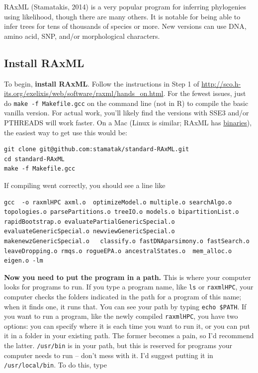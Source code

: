 \documentclass[]{article}
\begin{document}
RAxML (Stamatakis, 2014) is a very popular program for inferring phylogenies using likelihood, though there are many others. It is notable for being able to infer trees for tens of thousands of species or more. New versions can use DNA, amino acid, SNP, and/or morphological characters.

\hypertarget{install-raxml}{%
\subsection{Install RAxML}\label{install-raxml}}

To begin, \textbf{install RAxML}. Follow the instructions in Step 1 of \url{http://sco.h-its.org/exelixis/web/software/raxml/hands_on.html}. For the fewest issues, just do \texttt{make\ -f\ Makefile.gcc} on the command line (not in R) to compile the basic vanilla version. For actual work, you'll likely find the versions with SSE3 and/or PTHREADS will work faster. On a Mac (Linux is similar; RAxML has \href{https://github.com/stamatak/standard-RAxML/tree/master/WindowsExecutables_v8.2.4}{binaries}), the easiest way to get use this would be:

\begin{verbatim}
git clone git@github.com:stamatak/standard-RAxML.git
cd standard-RAxML
make -f Makefile.gcc
\end{verbatim}

If compiling went correctly, you should see a line like

\begin{verbatim}
gcc  -o raxmlHPC axml.o  optimizeModel.o multiple.o searchAlgo.o topologies.o parsePartitions.o treeIO.o models.o bipartitionList.o rapidBootstrap.o evaluatePartialGenericSpecial.o evaluateGenericSpecial.o newviewGenericSpecial.o makenewzGenericSpecial.o   classify.o fastDNAparsimony.o fastSearch.o leaveDropping.o rmqs.o rogueEPA.o ancestralStates.o  mem_alloc.o  eigen.o -lm
\end{verbatim}

\textbf{Now you need to put the program in a path.} This is where your computer looks for programs to run. If you type a program name, like \texttt{ls} or \texttt{raxmlHPC}, your computer checks the folders indicated in the path for a program of this name; when it finds one, it runs that. You can see your path by typing \texttt{echo\ \$PATH}. If you want to run a program, like the newly compiled \texttt{raxmlHPC}, you have two options: you can specify where it is each time you want to run it, or you can put it in a folder in your existing path. The former becomes a pain, so I'd recommend the latter. \texttt{/usr/bin} is in your path, but this is reserved for programs your computer needs to run -- don't mess with it. I'd suggest putting it in \texttt{/usr/local/bin}. To do this, type
\end{document}
